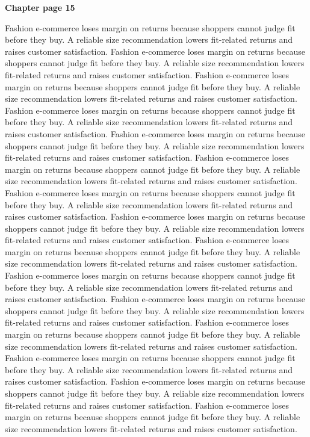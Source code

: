 \documentclass[a4paper,11pt]{article}
\begin{document}
{\headfont\bfseries\Large Chapter page 15}\par\medskip
Fashion e-commerce loses margin on returns because shoppers cannot judge fit before they buy. A reliable size recommendation lowers fit-related returns and raises customer satisfaction. Fashion e-commerce loses margin on returns because shoppers cannot judge fit before they buy. A reliable size recommendation lowers fit-related returns and raises customer satisfaction. Fashion e-commerce loses margin on returns because shoppers cannot judge fit before they buy. A reliable size recommendation lowers fit-related returns and raises customer satisfaction. Fashion e-commerce loses margin on returns because shoppers cannot judge fit before they buy. A reliable size recommendation lowers fit-related returns and raises customer satisfaction. Fashion e-commerce loses margin on returns because shoppers cannot judge fit before they buy. A reliable size recommendation lowers fit-related returns and raises customer satisfaction. 
Fashion e-commerce loses margin on returns because shoppers cannot judge fit before they buy. A reliable size recommendation lowers fit-related returns and raises customer satisfaction. Fashion e-commerce loses margin on returns because shoppers cannot judge fit before they buy. A reliable size recommendation lowers fit-related returns and raises customer satisfaction. Fashion e-commerce loses margin on returns because shoppers cannot judge fit before they buy. A reliable size recommendation lowers fit-related returns and raises customer satisfaction. Fashion e-commerce loses margin on returns because shoppers cannot judge fit before they buy. A reliable size recommendation lowers fit-related returns and raises customer satisfaction. Fashion e-commerce loses margin on returns because shoppers cannot judge fit before they buy. A reliable size recommendation lowers fit-related returns and raises customer satisfaction. 
Fashion e-commerce loses margin on returns because shoppers cannot judge fit before they buy. A reliable size recommendation lowers fit-related returns and raises customer satisfaction. Fashion e-commerce loses margin on returns because shoppers cannot judge fit before they buy. A reliable size recommendation lowers fit-related returns and raises customer satisfaction. Fashion e-commerce loses margin on returns because shoppers cannot judge fit before they buy. A reliable size recommendation lowers fit-related returns and raises customer satisfaction. Fashion e-commerce loses margin on returns because shoppers cannot judge fit before they buy. A reliable size recommendation lowers fit-related returns and raises customer satisfaction. Fashion e-commerce loses margin on returns because shoppers cannot judge fit before they buy. A reliable size recommendation lowers fit-related returns and raises customer satisfaction. \newpage
\end{document}
